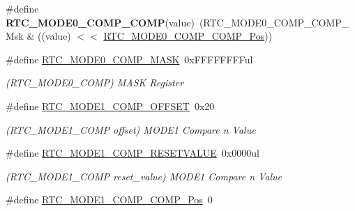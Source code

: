 \begin{DoxyCompactItemize}
\item 
\hypertarget{group___s_a_m_l21___r_t_c_ga05fba8e35f463e7de4c802fcd80df02c}{}\#define {\bfseries R\+T\+C\+\_\+\+M\+O\+D\+E0\+\_\+\+C\+O\+M\+P\+\_\+\+C\+O\+M\+P}(value)~(R\+T\+C\+\_\+\+M\+O\+D\+E0\+\_\+\+C\+O\+M\+P\+\_\+\+C\+O\+M\+P\+\_\+\+Msk \& ((value) $<$$<$ \hyperlink{group___s_a_m_l21___r_t_c_gad11fc5534c701be32db4687720ce549e}{R\+T\+C\+\_\+\+M\+O\+D\+E0\+\_\+\+C\+O\+M\+P\+\_\+\+C\+O\+M\+P\+\_\+\+Pos}))\label{group___s_a_m_l21___r_t_c_ga05fba8e35f463e7de4c802fcd80df02c}

\item 
\hypertarget{group___s_a_m_l21___r_t_c_gabc867940d21e198d0246c32ce7f08eeb}{}\#define \hyperlink{group___s_a_m_l21___r_t_c_gabc867940d21e198d0246c32ce7f08eeb}{R\+T\+C\+\_\+\+M\+O\+D\+E0\+\_\+\+C\+O\+M\+P\+\_\+\+M\+A\+S\+K}~0x\+F\+F\+F\+F\+F\+F\+F\+Ful\label{group___s_a_m_l21___r_t_c_gabc867940d21e198d0246c32ce7f08eeb}

\begin{DoxyCompactList}\small\item\em (R\+T\+C\+\_\+\+M\+O\+D\+E0\+\_\+\+C\+O\+M\+P) M\+A\+S\+K Register \end{DoxyCompactList}\item 
\hypertarget{group___s_a_m_l21___r_t_c_ga7bd91fe2edc882e144e13531844560d0}{}\#define \hyperlink{group___s_a_m_l21___r_t_c_ga7bd91fe2edc882e144e13531844560d0}{R\+T\+C\+\_\+\+M\+O\+D\+E1\+\_\+\+C\+O\+M\+P\+\_\+\+O\+F\+F\+S\+E\+T}~0x20\label{group___s_a_m_l21___r_t_c_ga7bd91fe2edc882e144e13531844560d0}

\begin{DoxyCompactList}\small\item\em (R\+T\+C\+\_\+\+M\+O\+D\+E1\+\_\+\+C\+O\+M\+P offset) M\+O\+D\+E1 Compare n Value \end{DoxyCompactList}\item 
\hypertarget{group___s_a_m_l21___r_t_c_gab5bfa9aa03593421aad0a188f370d0fc}{}\#define \hyperlink{group___s_a_m_l21___r_t_c_gab5bfa9aa03593421aad0a188f370d0fc}{R\+T\+C\+\_\+\+M\+O\+D\+E1\+\_\+\+C\+O\+M\+P\+\_\+\+R\+E\+S\+E\+T\+V\+A\+L\+U\+E}~0x0000ul\label{group___s_a_m_l21___r_t_c_gab5bfa9aa03593421aad0a188f370d0fc}

\begin{DoxyCompactList}\small\item\em (R\+T\+C\+\_\+\+M\+O\+D\+E1\+\_\+\+C\+O\+M\+P reset\+\_\+value) M\+O\+D\+E1 Compare n Value \end{DoxyCompactList}\item 
\hypertarget{group___s_a_m_l21___r_t_c_ga57893682ea302a030c54e3671a905892}{}\#define \hyperlink{group___s_a_m_l21___r_t_c_ga57893682ea302a030c54e3671a905892}{R\+T\+C\+\_\+\+M\+O\+D\+E1\+\_\+\+C\+O\+M\+P\+\_\+\+C\+O\+M\+P\+\_\+\+Pos}~0\label{group___s_a_m_l21___r_t_c_ga57893682ea302a030c54e3671a905892}


\end{DoxyCompactItemize}
